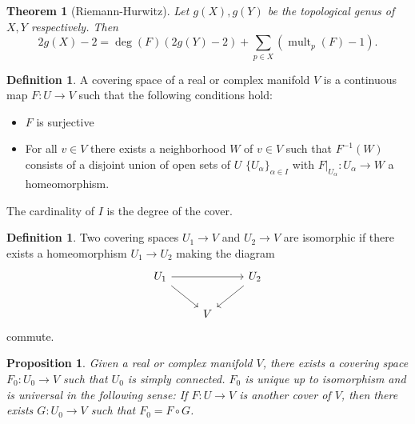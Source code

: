 \documentclass{dcthesis}
\newcommand{\defi}[1]{\textsf{#1}}
\DeclareMathOperator{\mult}{mult}
\numberwithin{equation}{section}
\newtheorem{theorem}[equation]{Theorem}
\newtheorem{prop}[equation]{Proposition}
\theoremstyle{definition}
\newtheorem{definition}[equation]{Definition}
\theoremstyle{remark}
\begin{document}
{{\begin{theorem}[Riemann-Hurwitz]
      Let $g(X), g(Y)$ be the topological genus
      of $X, Y$ respectively.
      Then
      \begin{equation}
        \label{eqn:riemannhurwitzforriemannsurfaces}
        2g(X)-2=
        \deg(F)(2g(Y)-2)+
        \sum_{p\in X}(\mult_p(F)-1).
      \end{equation}
    \end{theorem}
    \begin{definition}
      \label{def:coveringspace}
      A \defi{covering space}
      of a real or complex manifold $V$
      is a continuous map
      $F\colon U\to V$ such that
      the following conditions hold:
      \begin{itemize}
        \item
          $F$ is surjective
        \item
          For all $v\in V$
          there exists a neighborhood
          $W$ of $v\in V$ such that
          $F^{-1}(W)$ consists of a disjoint
          union of open sets of $U$
          $\{U_\alpha\}_{\alpha\in I}$
          with $F|_{U_\alpha}\colon U_\alpha\to W$
          a homeomorphism.
      \end{itemize}
      The cardinality of $I$ is the \defi{degree}
      of the cover.
    \end{definition}
    \begin{definition}
      \label{def:coveringspaceiso}
      Two covering spaces $U_1\to V$
      and $U_2\to V$ are
      \defi{isomorphic}
      if there exists a homeomorphism
      $U_1\to U_2$
      making the diagram
      \begin{equation}
        \label{eqn:coveringspaceiso}
        \begin{tikzcd}
          U_1\arrow{dr}\arrow{rr}{}&&U_2\arrow{dl}\\
                         &V
        \end{tikzcd}
      \end{equation}
      commute.
    \end{definition}
    \begin{prop}
      \label{prop:universalcoveringspace}
      Given a real or complex manifold $V$,
      there exists a covering space
      $F_0\colon U_0\to V$
      such that $U_0$ is simply connected.
      $F_0$ is unique up to isomorphism
      and is universal in the following sense:
      If $F\colon U\to V$ is another cover of $V$,
      then there exists
      $G\colon U_0\to V$
      such that $F_0 = F\circ G$.

\end{prop}}}
\end{document}
